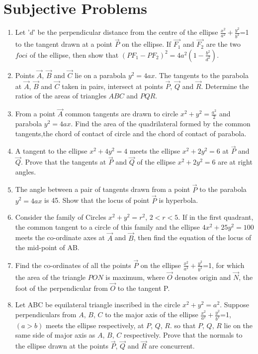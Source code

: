 \documentclass[journal]{IEEEtran}
\numberwithin{equation}{enumi}
\numberwithin{figure}{enumi}
\begin{document}
\section{Subjective Problems}
\begin{enumerate}
\item Let '$d$' be the perpendicular distance from the centre of the ellipse $\frac{x^2}{a^2}+\frac{y^2}{b^2}$=1  to the tangent drawn at a point $\Vec{P}$ on the ellipse. If $\Vec{F_1}$ and       $\Vec{F_2}$ are the two $foci$ of the ellipse, then show that $(PF_1-PF_2)^2=4a^2(1-\frac{b^2}{d^2})$.
\hfill{}

\item Points $\Vec{A}$, $\Vec{B}$ and $\Vec{C}$ lie on a parabola $y^2=4ax$. The tangents to the parabola at $\vec{A}$, $\vec{B}$ and $\vec{C}$ taken in pairs, intersect at points $\Vec{P}$, $\Vec{Q}$ and $\Vec{R}$. Determine the ratios of the areas of triangles $ABC$ and $PQR$. \hfill{}
\item From a point $\Vec{A}$ common tangents  are drawn to circle $x^2+y^2=\frac{a^2}{2}$ and parabola $y^2=4ax$. Find the area of the quadrilateral formed by the common tangents,the chord of contact of circle and the chord of contact of parabola.
\hfill{}
\item A tangent to the ellipse $x^2+4y^2=4$ meets the ellipse $x^2+2y^2=6$ at $\Vec{P}$ and $\Vec{Q}$. Prove that the tangents at $\Vec{P}$ and $\Vec{Q}$ of the ellipse $x^2+2y^2=6$ are at right angles.
\hfill{}
\item The angle between a pair of tangents drawn from a point $\Vec{P}$ to the parabola $y^2=4ax$ is 45\degree . Show that the locus of point $\Vec{P}$ is hyperbola.
\hfill{}
\item Consider the family of Circles $x^2+y^2=r^2$, $2<r<5$. If in the first quadrant, the common tangent to a circle of this family and the ellipse $4x^2+25y^2=100$ meets the co-ordinate axes at $\Vec{A}$ and $\Vec{B}$, then find the equation of the locus of the mid-point  of AB.
\hfill{}
\item Find the co-ordinates of all the points $\Vec{P}$ on the ellipse $\frac{x^2}{a^2}+\frac{y^2}{b^2}$=1, for which the area of the triangle $PON$ is maximum, where $\Vec{O}$ denotes origin  and $\Vec{N}$, the foot of the perpendicular from $\vec{O}$ to the tangent P.
\hfill{}
\item  Let ABC be equilateral triangle inscribed in the circle $x^2+y^2=a^2$. Suppose perpendiculars from $A$, $B$, $C$ to the major axis of the ellipse $\frac{x^2}{a^2}+\frac{y^2}{b^2}$=1, $(a>b)$ meets the ellipse respectively, at $P$, $Q$, $R$. so that $P$, $Q$, $R$ lie on the same side of major axis as $A$, $B$, $C$ respectively. Prove that the normals to the ellipse drawn at the points $\vec{P}$, $\vec{Q}$ and $\vec{R}$ are concurrent.

\end{enumerate}
\end{document}

